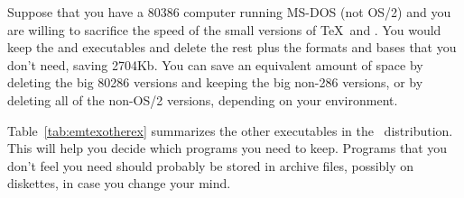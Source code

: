 Suppose that you have a 80386 computer running MS-DOS (not OS/2) and 
you are willing to sacrifice the speed of the small versions of \TeX\
and \MF.  You would keep the  and
 executables and delete the rest plus the
formats and bases that you don't need, saving 2704Kb.  You can save
an equivalent amount of space by deleting the big 80286 versions and
keeping the big non-286 versions, or by deleting all of the non-OS/2
versions, depending on your environment.

Table~\ref{tab:emtexotherex} summarizes the other executables in the
\emTeX\ distribution.  This will help you decide which programs you
need to keep.  Programs that you don't feel you need should probably
be stored in archive files, possibly on diskettes, in case you change
your mind.  

